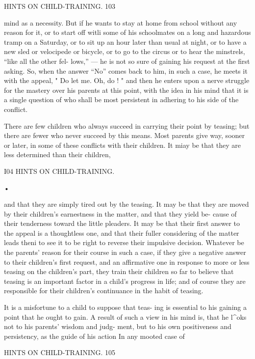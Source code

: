 \documentclass[
]{book}
\begin{document}
HINTS ON CHILD-TRAINING. 103

mind as a necessity. But if he wants to stay at home from school without any reason for it, or to start off witli some of his schoolmates on a long and hazardous tramp on a Saturday, or to sit up an hour later than usual at night, or to have a new sled or velocipede or bicycle, or to go to the circus or to hear the minstrels, ``like all the other fel- lows,'' --- he is not so sure of gaining his request at the first asking. So, when the answer ``No'' comes back to him, in such a case, he meets it with the appeal, " Do let me. Oh, do ! " and then he enters upon a nerve struggle for the mastery over his parents at this point, with the idea in his mind that it is a single question of who shall be most persistent in adhering to his side of the conflict.

There are few children who always succeed in carrying their point by teasing; but there are fewer who never succeed by this means. Most parents give way, sooner or later, in some of these conflicts with their children. It miay be that they are less determined than their children,

I04 HINTS ON CHILD-TRAINING.

•

and that they are simply tired out by the teasing. It may be that they are moved by their children's earnestness in the matter, and that they yield be- cause of their tenderness toward the little pleaders. It may be that their first answer to the appeal is a thoughtless one, and that their fuller considering of the matter leads theni to see it to be right to reverse their impulsive decision. Whatever be the parents' reason for their course in such a case, if they give a negative answer to their children's first request, and an affirmative one in response to more or less teasing on the children's part, they train their children so far to believe that teasing is an important factor in a child's progress in life; and of course they are responsible for their children's continuance in the habit of teasing.

It is a misfortune to a child to suppose that teas- ing is essential to his gaining a point that he ought to gain. A result of such a view in his mind is, that he l\^{}oks not to his parents' wisdom and judg- ment, but to his own positiveness and persistency, as the guide of his action In any mooted case of

HINTS ON CHILD-TRAINING. 105
\end{document}
